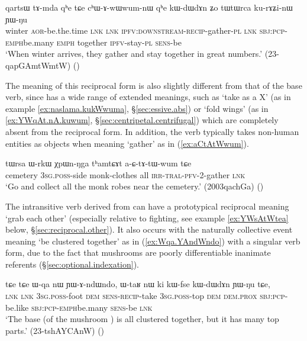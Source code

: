 \begin{exe}
\ex \label{ex:chAwWwumnW}
\gll qartsɯ tɤ-mda qʰe tɕe cʰɯ-ɤ-wɯ\redp{}wum-nɯ qʰe kɯ-dɯ\redp{}dɤn ʑo tɯtɯrca ku-rɤʑi-nɯ ɲɯ-ŋu \\
winter \textsc{aor}-be.the.time \textsc{lnk} \textsc{lnk} \textsc{ipfv}:\textsc{downstream}-\textsc{recip}-gather-\textsc{pl} \textsc{lnk} \textsc{sbj}:\textsc{pcp}-\textsc{emph}\redp{}be.many \textsc{emph} together \textsc{ipfv}-stay-\textsc{pl} \textsc{sens}-be \\
\glt `When winter arrives, they gather and stay together in great numbers.' (23-qapGAmtWmtW) 	()
\end{exe}

The meaning of this reciprocal form is also slightly different from that of the base verb, since  has a wide range of extended meanings, such as `take as a X' (as in example \ref{ex:naslama.kukWwuma}, §\ref{sec:essive.abs}) or `fold wings' (as in \ref{ex:YWqAt.nA.kuwum}, §\ref{sec:centripetal.centrifugal}) which are completely absent from the reciprocal form. In addition, the verb   typically takes non-human entities as objects when meaning `gather' as in (\ref{ex:aCtAtWwum}).

\begin{exe}
\ex \label{ex:aCtAtWwum}
\gll tɯrsa ɯ-rkɯ χpɯn-ŋga tʰamtɕɤt a-ɕ-tɤ-tɯ-wum tɕe \\
cemetery \textsc{3sg}.\textsc{poss}-side monk-clothes all \textsc{irr}-\textsc{tral}-\textsc{pfv}-2-gather \textsc{lnk} \\
\glt `Go and collect all the monk robes near the cemetery.' (2003qachGa)
()
\end{exe}
 
The intransitive verb  derived from  can have a prototypical reciprocal meaning `grab each other' (especially relative to fighting, see example \ref{ex:YWsAtWtea} below, §\ref{sec:reciprocal.other}). It also occurs with the naturally collective event meaning `be clustered together' as in (\ref{ex:Wqa.YAndWndo}) with a singular verb form, due to the fact that mushrooms are poorly differentiable inanimate referents (§\ref{sec:optional.indexation}).

\begin{exe}
\ex \label{ex:Wqa.YAndWndo}
\gll tɕe tɕe ɯ-qa nɯ ɲɯ-ɤ-ndɯ\redp{}ndo, ɯ-taʁ nɯ ki kɯ-fse kɯ-dɯ\redp{}dɤn ɲɯ-ŋu tɕe, \\
 \textsc{lnk} \textsc{lnk} \textsc{3sg}.\textsc{poss}-foot \textsc{dem} \textsc{sens}-\textsc{recip}-take \textsc{3sg}.\textsc{poss}-top \textsc{dem} \textsc{dem}.\textsc{prox} \textsc{sbj}:\textsc{pcp}-be.like \textsc{sbj}:\textsc{pcp}-\textsc{emph}\redp{}be.many \textsc{sens}-be \textsc{lnk} \\
\glt `The base (of the mushroom ) is all clustered together, but it has many top parts.' (23-tshAYCAnW)
()
\end{exe}

